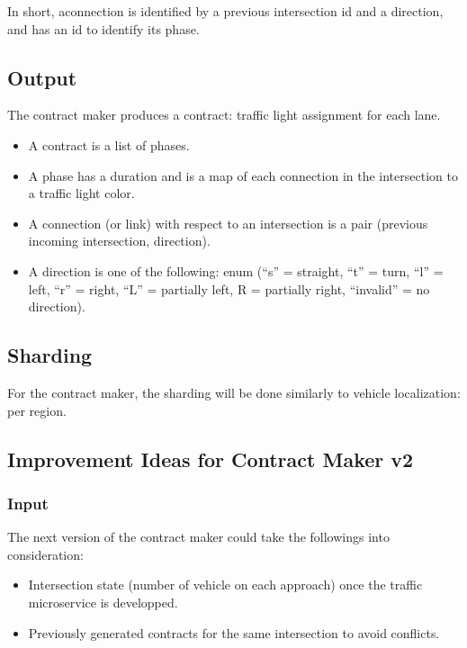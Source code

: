 \documentclass[letterpaper,10pt,english]{sphinxmanual}
\begin{document}
In short, aconnection is identified by a previous intersection id and a direction, and has an id to identify its phase.


\subsection{Output}
\label{\detokenize{microservices/contract_maker/output:output}}\label{\detokenize{microservices/contract_maker/output::doc}}
The contract maker produces a contract: traffic light assignment for each lane.
\begin{itemize}
\item {} 
A contract is a list of phases.

\item {} 
A phase has a duration and is a map of each connection in the intersection to a traffic light color.

\item {} 
A connection (or link) with respect to an intersection is a pair (previous incoming intersection, direction).

\item {} 
A direction is one of the following:  enum (“s” = straight, “t” = turn, “l” = left, “r” = right, “L” = partially left, R = partially right, “invalid” = no direction).

\end{itemize}


\subsection{Sharding}
\label{\detokenize{microservices/contract_maker/sharding:sharding}}\label{\detokenize{microservices/contract_maker/sharding::doc}}
For the contract maker, the sharding will be done similarly to vehicle localization: per region.


\subsection{Improvement Ideas for Contract Maker v2}
\label{\detokenize{microservices/contract_maker/improvements:improvement-ideas-for-contract-maker-v2}}\label{\detokenize{microservices/contract_maker/improvements::doc}}

\subsubsection{Input}
\label{\detokenize{microservices/contract_maker/improvements:input}}
The next version of the contract maker could take the followings into consideration:
\begin{itemize}
\item {} 
Intersection state (number of vehicle on each approach) once the traffic microservice is developped.

\item {} 
Previously generated contracts for the same intersection to avoid conflicts.

\end{itemize}
\end{document}

